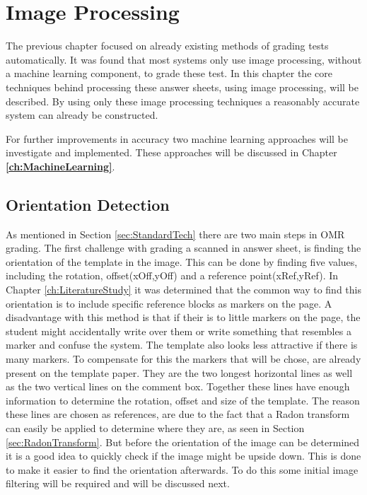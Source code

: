 \chapter{Image Processing}
\label{ch:ImageProcessing}
\graphicspath{{Chapter3/Chapter3Figures/}}
The previous chapter focused on already existing methods of grading tests automatically. It was found that most systems only use image processing, without a machine learning component, to grade these test. In this chapter the core techniques behind processing these answer sheets, using image processing, will be described. By using only these image processing techniques a reasonably accurate system can already be constructed.

For further improvements in accuracy two machine learning approaches will be investigate and implemented. These approaches will be discussed in Chapter \textbf{\ref{ch:MachineLearning}}.

\section{Orientation Detection}

As mentioned in Section \ref{sec:StandardTech} there are two main steps in OMR grading. The first challenge with grading a scanned in answer sheet, is finding the orientation of the template in the image. This can be done by finding five values, including the rotation, offset(xOff,yOff) and a reference point(xRef,yRef). In Chapter \ref{ch:LiteratureStudy} it was determined that the common way to find this orientation is to include specific reference blocks as markers on the page. A disadvantage with this method is that if their is to little markers on the page, the student might accidentally write over them or write something that resembles a marker and confuse the system. The template also looks less attractive if there is many markers. To compensate for this the markers that will be chose, are already present on the template paper. They are the two longest horizontal lines as well as the two vertical lines on the comment box. Together these lines have enough information to determine the rotation, offset and size of the template. The reason these lines are chosen as references, are due to the fact that a Radon transform can easily be applied to determine where they are, as seen in Section \ref{sec:RadonTransform}. But before the orientation of the image can be determined it is a good idea to quickly check if the image might be upside down. This is done to make it easier to find the orientation afterwards. To do this some initial image filtering will be required and will be discussed next.

